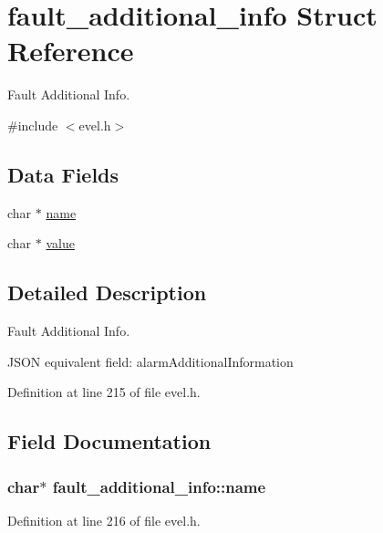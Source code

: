 \hypertarget{structfault__additional__info}{}\section{fault\+\_\+additional\+\_\+info Struct Reference}
\label{structfault__additional__info}


Fault Additional Info.  




{\ttfamily \#include $<$evel.\+h$>$}

\subsection*{Data Fields}
\begin{DoxyCompactItemize}
\item 
char $\ast$ \hyperlink{structfault__additional__info_af31e72ad2309cfb4a04e00a41daabfaa}{name}
\item 
char $\ast$ \hyperlink{structfault__additional__info_aed1daed022cd49c694feccc8635236c4}{value}
\end{DoxyCompactItemize}


\subsection{Detailed Description}
Fault Additional Info. 

J\+S\+O\+N equivalent field\+: alarm\+Additional\+Information 

Definition at line 215 of file evel.\+h.



\subsection{Field Documentation}
\hypertarget{structfault__additional__info_af31e72ad2309cfb4a04e00a41daabfaa}{}
\subsubsection[{name}]{\setlength{\rightskip}{0pt plus 5cm}char$\ast$ fault\+\_\+additional\+\_\+info\+::name}\label{structfault__additional__info_af31e72ad2309cfb4a04e00a41daabfaa}


Definition at line 216 of file evel.\+h.

